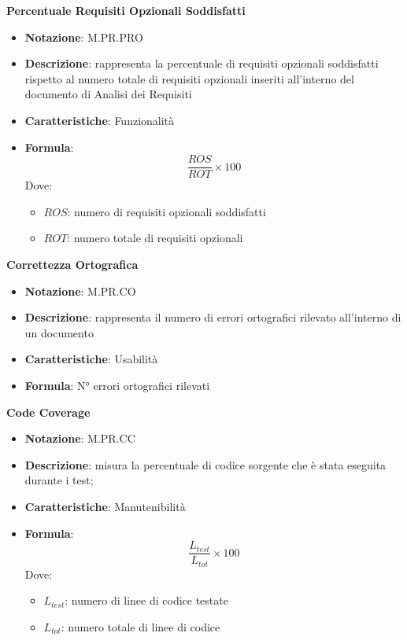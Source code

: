 \textbf{Percentuale Requisiti Opzionali Soddisfatti}
\begin{itemize}
    \item \textbf{Notazione}: M.PR.PRO
    \item \textbf{Descrizione}: rappresenta la percentuale di requisiti opzionali soddisfatti rispetto al numero totale di requisiti opzionali inseriti all'interno del documento di Analisi dei Requisiti
    \item \textbf{Caratteristiche}: Funzionalità
    \item \textbf{Formula}:  
    \begin{equation}
        \frac{ROS}{ROT} \times 100
    \end{equation}
    Dove:
    \begin{itemize}
        \item $ROS$: numero di requisiti opzionali soddisfatti
        \item $ROT$: numero totale di requisiti opzionali  
    \end{itemize}
\end{itemize}

\textbf{Correttezza Ortografica}
\begin{itemize}
    \item \textbf{Notazione}: M.PR.CO
    \item \textbf{Descrizione}: rappresenta il numero di errori ortografici rilevato all'interno di un documento 
    \item \textbf{Caratteristiche}: Usabilità
    \item \textbf{Formula}: N° errori ortografici rilevati
\end{itemize}

\textbf{Code Coverage}
\begin{itemize}
    \item \textbf{Notazione}: M.PR.CC
    \item \textbf{Descrizione}: misura la percentuale di codice sorgente che è stata eseguita durante i test;
    \item \textbf{Caratteristiche}: Manutenibilità
    \item \textbf{Formula}: 
    \begin{equation}
        \frac{L_{test}}{L_{tot}} \times 100
    \end{equation}
    Dove:
    \begin{itemize}
        \item $L_{test}$: numero di linee di codice testate
        \item $L_{tot}$: numero totale di linee di codice  
    \end{itemize}
\end{itemize}

